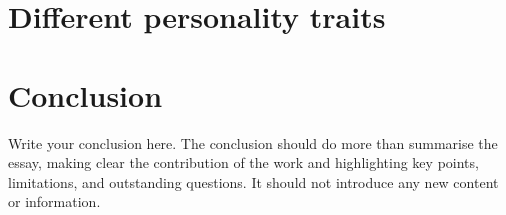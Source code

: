 \documentclass{scrartcl}
\begin{document}
\section{Different personality traits}


\section{Conclusion}

Write your conclusion here. The conclusion should do more than summarise the essay, making clear the contribution of the work and highlighting key points, limitations, and outstanding questions. It should not introduce any new content or information.



\end{document}
